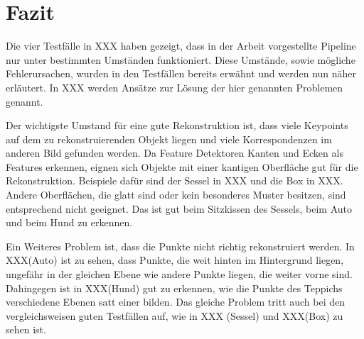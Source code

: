 
\chapter{Fazit}
Die vier Testfälle in XXX haben gezeigt, dass in der Arbeit vorgestellte Pipeline nur unter bestimmten Umständen funktioniert.
Diese Umstände, sowie mögliche Fehlerursachen, wurden in den Testfällen bereits erwähnt und werden nun näher erläutert.
In XXX werden Ansätze zur Lösung der hier genannten Problemen genannt.

Der wichtigste Umstand für eine gute Rekonstruktion ist, dass viele Keypoints auf dem zu rekonstruierenden Objekt liegen und viele Korrespondenzen im anderen Bild gefunden werden.
Da Feature Detektoren Kanten und Ecken als Features erkennen, eignen sich Objekte mit einer kantigen Oberfläche gut für die Rekonstruktion.
Beispiele dafür sind der Sessel in XXX und die Box in XXX.
Andere Oberflächen, die glatt sind oder kein besonderes Muster besitzen, sind entsprechend nicht geeignet.
Das ist gut beim Sitzkissen des Sessels, beim Auto und beim Hund zu erkennen. 

Ein Weiteres Problem ist, dass die Punkte nicht richtig rekonstruiert werden.
In XXX(Auto) ist zu sehen, dass Punkte, die weit hinten im Hintergrund liegen, ungefähr in der gleichen Ebene wie andere Punkte liegen, die weiter vorne sind.  
Dahingegen ist in XXX(Hund) gut zu erkennen, wie die Punkte des Teppichs verschiedene Ebenen satt einer bilden.
Das gleiche Problem tritt auch bei den vergleichsweisen guten Testfällen auf, wie in XXX (Sessel) und XXX(Box) zu sehen ist.

